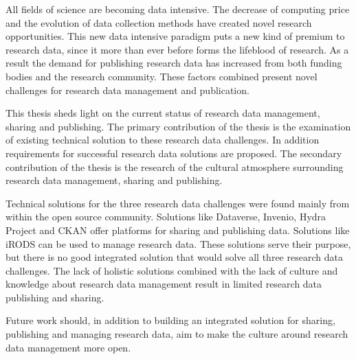 All fields of science are becoming data intensive. The decrease of computing
price and the evolution of data collection methods have created novel research
opportunities. This new data intensive paradigm
puts a new kind of premium to research data, since it more than ever before
forms the lifeblood of research. As a result the demand for publishing
research data has increased from both funding bodies and the research
community. These factors combined present novel challenges for research data
management and publication.

This thesis sheds light on the current status of research data management,
sharing and publishing. The primary contribution of the thesis is the
examination of existing technical solution to these research data challenges.
In addition requirements for successful research data solutions are proposed.
The secondary contribution of the thesis is the research of the cultural
atmosphere surrounding research data management, sharing and publishing.

Technical solutions for the three research data challenges were found mainly from
within the open source community. Solutions like Dataverse, Invenio, Hydra
Project and CKAN offer platforms for sharing and publishing data. Solutions
like iRODS can be used to manage research data. These solutions serve
their purpose, but there is no good integrated solution that would solve all
three research data challenges. The lack of holistic solutions combined with the lack of
culture and knowledge about research data management result in limited research
data publishing and sharing.

Future work should, in addition to
building an integrated solution for sharing, publishing and managing research data, aim to
make the culture around research data management more open.


